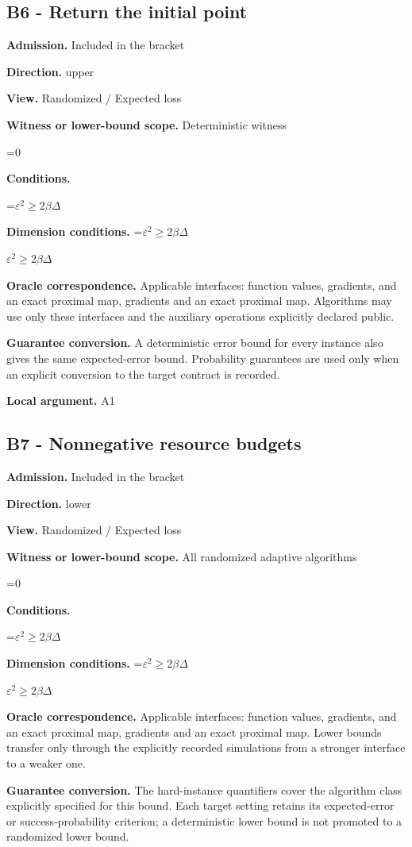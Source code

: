 \documentclass[10pt,a4paper]{article}
\newcommand{\AtlasMath}[1]{\par\begingroup\centering\setbox0=\hbox{$\displaystyle #1$}\ifdim\wd0>1.4\linewidth\typeout{ATLAS WIDE FORMULA: \the\wd0}\fi\ifdim\wd0>\linewidth\resizebox{\linewidth}{!}{\box0}\else\box0\fi\par\endgroup}
\newcommand{\AtlasInlineMath}[1]{\begingroup\setbox0=\hbox{$#1$}\ifdim\wd0>.4\linewidth\endgroup\AtlasMath{#1}\else\endgroup$#1$\fi}
\begin{document}
\subsection{B6 - Return the initial point}
\textbf{Admission.} Included in the bracket

\textbf{Direction.} upper

\textbf{View.} Randomized / Expected loss

\textbf{Witness or lower-bound scope.} Deterministic witness

\AtlasMath{0}
\textbf{Conditions.} 
\AtlasMath{\varepsilon^2\ge2\beta\Delta}


\textbf{Dimension conditions.} \AtlasInlineMath{\varepsilon^2\ge2\beta\Delta}

\textbf{Oracle correspondence.} Applicable interfaces: function values, gradients, and an exact proximal map, gradients and an exact proximal map. Algorithms may use only these interfaces and the auxiliary operations explicitly declared public.

\textbf{Guarantee conversion.} A deterministic error bound for every instance also gives the same expected-error bound. Probability guarantees are used only when an explicit conversion to the target contract is recorded.

\textbf{Local argument.} A1

\subsection{B7 - Nonnegative resource budgets}
\textbf{Admission.} Included in the bracket

\textbf{Direction.} lower

\textbf{View.} Randomized / Expected loss

\textbf{Witness or lower-bound scope.} All randomized adaptive algorithms

\AtlasMath{0}
\textbf{Conditions.} 
\AtlasMath{\varepsilon^2\ge2\beta\Delta}


\textbf{Dimension conditions.} \AtlasInlineMath{\varepsilon^2\ge2\beta\Delta}

\textbf{Oracle correspondence.} Applicable interfaces: function values, gradients, and an exact proximal map, gradients and an exact proximal map. Lower bounds transfer only through the explicitly recorded simulations from a stronger interface to a weaker one.

\textbf{Guarantee conversion.} The hard-instance quantifiers cover the algorithm class explicitly specified for this bound. Each target setting retains its expected-error or success-probability criterion; a deterministic lower bound is not promoted to a randomized lower bound.
\end{document}
